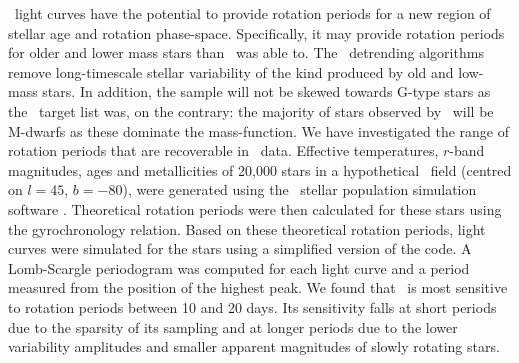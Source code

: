 \LSST\ light curves have the potential to provide rotation periods for a new
region of stellar age and rotation phase-space.
Specifically, it may provide rotation periods for older and lower mass stars
than \kepler\ was able to.
The \kepler\ detrending algorithms remove long-timescale stellar variability
of the kind produced by old and low-mass stars.
In addition, the sample will not be skewed towards G-type stars as the
\kepler\ target list was, on the contrary: the majority of stars observed by
\LSST\ will be M-dwarfs as these dominate the mass-function.
We have investigated the range of rotation periods that are recoverable in
\LSST\ data.
Effective temperatures, $r$-band magnitudes, ages and metallicities of 20,000
stars in a hypothetical \LSST\ field (centred on $l=45$, $b=-80$), were
generated using the \trilegal\ stellar population simulation software
\citep{Girardi2012}.
Theoretical rotation periods were then calculated for these stars using the
\citep{Angus2015} gyrochronology relation.
Based on these theoretical rotation periods, light curves were simulated for
the stars using a simplified version of the \citep{Aigrain2015} code.
A Lomb-Scargle periodogram was computed for each light curve and a period
measured from the position of the highest peak.
We found that \LSST\ is most sensitive to rotation periods between 10 and 20
days.
Its sensitivity falls at short periods due to the sparsity of its sampling and
at longer periods due to the lower variability amplitudes and smaller apparent
magnitudes of slowly rotating stars.


